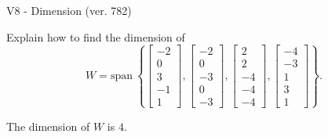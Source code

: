 \begin{exercise}
  \begin{exerciseTitle}V8 - Dimension (ver. 782)\end{exerciseTitle}
  \begin{exerciseStatement}
    Explain how to find the dimension of 
\[W=\mathrm{span}\ \left\{\left[\begin{array}{r}
-2 \\
0 \\
3 \\
-1 \\
1
\end{array}\right] , \left[\begin{array}{r}
-2 \\
0 \\
-3 \\
0 \\
-3
\end{array}\right] , \left[\begin{array}{r}
2 \\
2 \\
-4 \\
-4 \\
-4
\end{array}\right] , \left[\begin{array}{r}
-4 \\
-3 \\
1 \\
3 \\
1
\end{array}\right]\right\}.\]



  \end{exerciseStatement}
  \begin{exerciseAnswer}
   The dimension of \(W\) is  \(4\).
  


  \end{exerciseAnswer}
\end{exercise}
